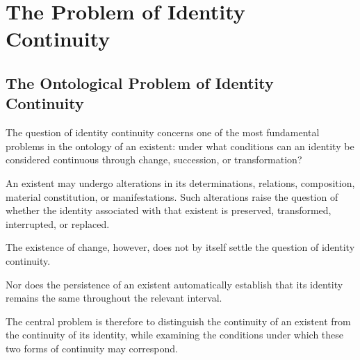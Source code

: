 %
%

\section{The Problem of Identity Continuity}
\label{sec:problem-of-identity-continuity}

\subsection{The Ontological Problem of Identity Continuity}

The question of identity continuity concerns one of the
most fundamental problems in the ontology of an existent:
under what conditions can an identity be considered
continuous through change, succession, or transformation?

An existent may undergo alterations in its determinations,
relations, composition, material constitution, or
manifestations. Such alterations raise the question
of whether the identity associated with that existent
is preserved, transformed, interrupted, or replaced.

The existence of change, however, does not by itself
settle the question of identity continuity.

Nor does the persistence of an existent automatically
establish that its identity remains the same throughout
the relevant interval.

The central problem is therefore to distinguish the
continuity of an existent from the continuity of its
identity, while examining the conditions under which
these two forms of continuity may correspond.


